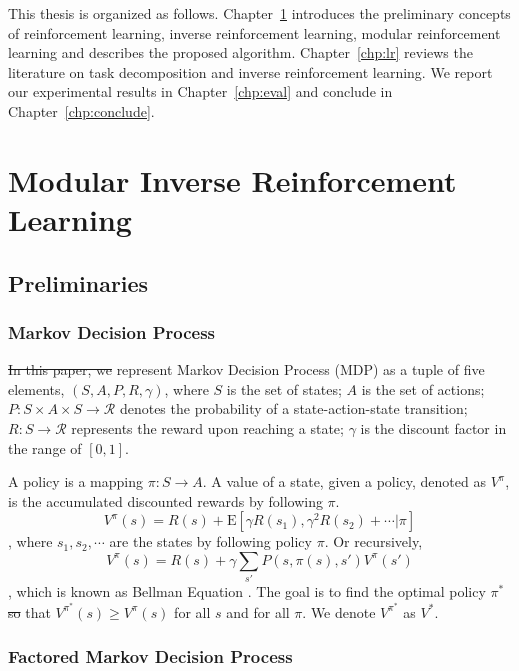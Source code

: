 \documentclass[12pt]{report}	%
\theoremstyle{definition}
\theoremstyle{remark}
\newcommand{\E}{\mathrm{E}}
\providecommand{\DIFadd}[1]{{\protect\color{blue}\uwave{#1}}} %
\providecommand{\DIFdel}[1]{{\protect\color{red}\sout{#1}}}                      %
\providecommand{\DIFaddbegin}{} %
\providecommand{\DIFaddend}{} %
\providecommand{\DIFdelbegin}{} %
\providecommand{\DIFdelend}{} %
\begin{document}
This thesis is organized as follows. Chapter~\ref{chp:mirl} introduces the
preliminary concepts of reinforcement learning, inverse reinforcement learning,
modular reinforcement learning and describes the proposed algorithm.
Chapter~\ref{chp:lr} reviews the literature on task decomposition and inverse
reinforcement learning. We report our experimental results in
Chapter~\ref{chp:eval} and conclude in Chapter~\ref{chp:conclude}.


\chapter{Modular Inverse Reinforcement Learning}
\label{chp:mirl}
\section{Preliminaries}

\subsection{Markov Decision Process}

\DIFdelbegin \DIFdel{In this paper, we }\DIFdelend \DIFaddbegin \DIFadd{We }\DIFaddend represent Markov Decision Process (MDP)
\cite{sutton1998introduction} as a tuple of
five elements, $(S, A, P, R, \gamma)$, where $S$ is the set of states; $A$ is
the set of actions; $P: S \times A \times S \rightarrow \mathcal{R}$ denotes the
probability of a state-action-state transition; $R: S \rightarrow
\mathcal{R}$ represents the reward upon reaching a state; $\gamma$ is the
discount factor in the range of $[0, 1]$.

A policy is a mapping $\pi: S \rightarrow A$. A value of a state, given a
policy, denoted as $V^\pi$, is the accumulated discounted rewards by following
$\pi$.
$$V^\pi(s) = R(s) + \E[\gamma R(s_1), \gamma^2 R(s_2) + \cdots | \pi]$$, where
$s_1, s_2, \cdots$ are the states by following policy $\pi$. Or recursively,
$$V^\pi(s) = R(s) + \gamma \sum_{s'} P(s, \pi(s), s')V^\pi(s')$$,
which is known as Bellman Equation \cite{sutton1998introduction}. The goal is to find the optimal
policy $\pi^*$ \DIFdelbegin \DIFdel{so }\DIFdelend \DIFaddbegin \DIFadd{such }\DIFaddend that $V^{\pi^*}(s) \geq V^\pi(s)$ for all $s$ and for all
$\pi$. We denote $V^{\pi^*}$ as $V^*$.

\subsection{Factored Markov Decision Process}
\end{document}
